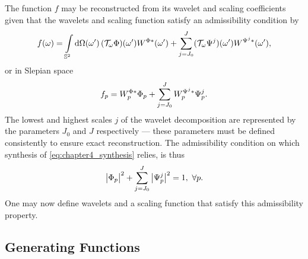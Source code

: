 The function \(f\) may be reconstructed from its wavelet and scaling coefficients given that the wavelets and scaling function satisfy an admissibility condition by
%
\begin{equation}\label{eq:chapter4_synthesis}
	\pixel{f}
	= \integrateSphere{\omega'}
	\pixel[']{(\translation{\omega}\Phi)} \pixel[']{W^{\Phi\ast}}
	+ \waveletSum \pixel[']{(\translation{\omega}\Psi^{j})} \pixel[']{W^{\Psi^{j}\ast}},
\end{equation}
%
or in Slepian space
%
\begin{equation}
	\slepian{f}
	= \slepian{W}^{\Phi\ast} \slepian{\Phi}
	+ \waveletSum \slepian{W}^{\Psi^{j}\ast} \slepian{\Psi}^{j}.
\end{equation}
%
The lowest and highest scales \(j\) of the wavelet decomposition are represented by the parameters \(J_{0}\) and \(J\) respectively --- these parameters must be defined consistently to ensure exact reconstruction.
The admissibility condition on which synthesis of \cref{eq:chapter4_synthesis} relies, is thus
%
\begin{equation}\label{eq:chapter4_admissibility}
	\abs{\slepian{\Phi}}^{2}
	+ \waveletSum \abs{\slepian{\Psi}^{j}}^{2}
	= 1,\ \forall p.
\end{equation}
%
One may now define wavelets and a scaling function that satisfy this admissibility property.

\subsection{Generating Functions}\label{sec:chapter4_generating_functions}

